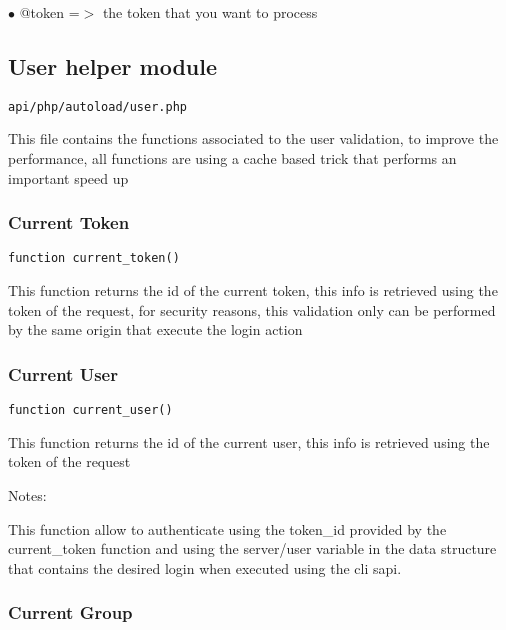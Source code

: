 \documentclass[a4paper]{article}
\begin{document}
\begin{compactitem}
\item[\color{myblue}$\bullet$] @token =$>$ the token that you want to process
\end{compactitem}

\hypertarget{toc261}{}
\subsection{User helper module}

\begin{lstlisting}
api/php/autoload/user.php
\end{lstlisting}

This file contains the functions associated to the user validation, to
improve the performance, all functions are using a cache based trick
that performs an important speed up

\hypertarget{toc262}{}
\subsubsection{Current Token}

\begin{lstlisting}
function current_token()
\end{lstlisting}

This function returns the id of the current token, this info is retrieved
using the token of the request, for security reasons, this validation only
can be performed by the same origin that execute the login action

\hypertarget{toc263}{}
\subsubsection{Current User}

\begin{lstlisting}
function current_user()
\end{lstlisting}

This function returns the id of the current user, this info is retrieved
using the token of the request

Notes:

This function allow to authenticate using the token\_id provided by the
current\_token function and using the server/user variable in the data
structure that contains the desired login when executed using the cli
sapi.

\hypertarget{toc264}{}
\subsubsection{Current Group}
\end{document}
